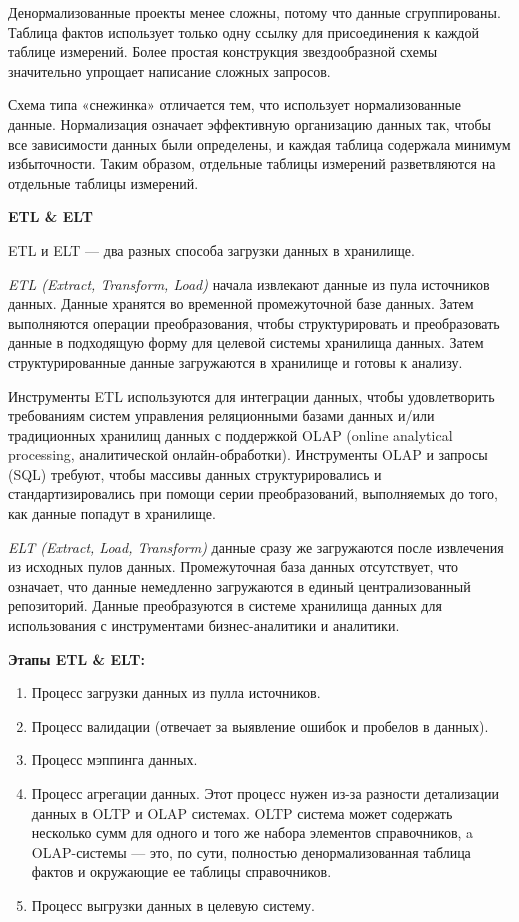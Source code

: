 Денормализованные проекты менее сложны, потому что данные сгруппированы. Таблица фактов использует только одну ссылку для присоединения к каждой таблице измерений. Более простая конструкция звездообразной схемы значительно упрощает написание сложных запросов.

Схема типа «снежинка» отличается тем, что использует нормализованные данные. Нормализация означает эффективную организацию данных так, чтобы все зависимости данных были определены, и каждая таблица содержала минимум избыточности. Таким образом, отдельные таблицы измерений разветвляются на отдельные таблицы измерений.

\textbf{ETL \&  ELT}

ETL и ELT — два разных способа загрузки данных в хранилище.

\textit{ETL (Extract, Transform, Load)} начала извлекают данные из пула источников данных. Данные хранятся во временной промежуточной базе данных. Затем выполняются операции преобразования, чтобы структурировать и преобразовать данные в подходящую форму для целевой системы хранилища данных. Затем структурированные данные загружаются в хранилище и готовы к анализу.

Инструменты ETL используются для интеграции данных, чтобы удовлетворить требованиям систем управления реляционными базами данных и/или традиционных хранилищ данных с поддержкой OLAP (online analytical processing, аналитической онлайн-обработки). Инструменты OLAP и запросы (SQL) требуют, чтобы массивы данных структурировались и стандартизировались при помощи серии преобразований, выполняемых до того, как данные попадут в хранилище.

\textit{ELT (Extract, Load, Transform)} данные сразу же загружаются после извлечения из исходных пулов данных. Промежуточная база данных отсутствует, что означает, что данные немедленно загружаются в единый централизованный репозиторий. Данные преобразуются в системе хранилища данных для использования с инструментами бизнес-аналитики и аналитики.

\textbf{Этапы ETL \&  ELT:}
\begin{enumerate}
	\item Процесс загрузки данных из пулла источников.
	\item Процесс валидации (отвечает за выявление ошибок и пробелов в данных).
	\item Процесс мэппинга данных.
	\item Процесс агрегации данных. Этот процесс нужен из-за разности детализации данных в OLTP и OLAP системах.
	OLTP система может содержать несколько сумм для одного и того же набора элементов справочников, a OLAP-системы — это, по сути, полностью денормализованная таблица фактов и окружающие ее таблицы справочников.
	\item Процесс выгрузки данных в целевую систему.
\end{enumerate}

